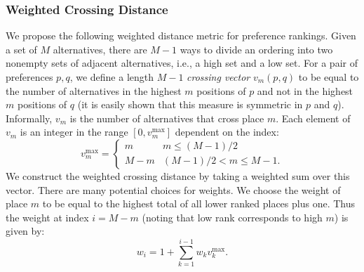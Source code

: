 \subsubsection{Weighted Crossing Distance}
We propose the following weighted distance metric for preference rankings.
Given a set of $M$ alternatives, there are $M-1$ ways to divide an ordering into two nonempty sets of adjacent alternatives, i.e., a high set and a low set.
For a pair of preferences $p, q$, we define a length $M - 1$ {\em crossing vector} $v_m(p, q)$ to be equal to the number of alternatives in the highest $m$ positions of $p$ and not in the highest $m$ positions of $q$ (it is easily shown that this measure is symmetric in $p$ and $q$).
Informally, $v_m$ is the number of alternatives that cross place $m$.
Each element of $v_m$ is an integer in the range $[0, v_m^{\max}]$ dependent on the index:
\begin{equation}
\label{eqn:distance-max}
    v_m^{\max} =
    \begin{cases}
    m & m \leq (M - 1) / 2 \\
    M - m & (M - 1) / 2 < m \leq M - 1.
    \end{cases}
\end{equation}
We construct the weighted crossing distance by taking a weighted sum over this vector.
There are many potential choices for weights.
We choose the weight of place $m$ to be equal to the highest total of all lower ranked places plus one.
Thus the weight at index $i = M - m$ (noting that low rank corresponds to high $m$) is given by:
\begin{equation}
\label{eqn:weight}
    w_i = 1 + \sum_{k=1}^{i-1} w_k v_k^{\max}.
\end{equation}

